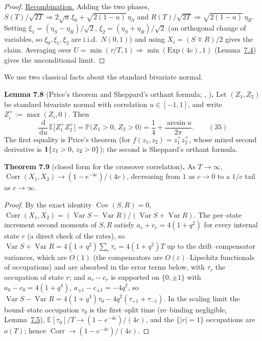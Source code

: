 \documentclass[11pt]{article}
\theoremstyle{plain}
\theoremstyle{definition}
\theoremstyle{remark}
\DeclareMathOperator{\Var}{Var}\DeclareMathOperator{\Cov}{Cov}
\DeclareMathOperator{\Corr}{Corr}\DeclareMathOperator{\cum}{cum}
\newcommand{\E}{\mathbb{E}}\newcommand{\PP}{\mathbb{P}}\newcommand{\dd}{\,\mathrm{d}}
\newcommand{\To}{\Rightarrow}\newcommand{\so}{\mathfrak{so}}
\newcommand{\eps}{\varepsilon}\newcommand{\Exp}{\mathrm{Exp}}
\begin{document}
\begin{proof}
\underline{Recombination.} Adding the two phases,
$S(T)/\sqrt{2T}\To2\sqrt u\,\xi_0+\sqrt{2(1-u)}\,\eta_S$ and
$R(T)/\sqrt{2T}\To\sqrt{2(1-u)}\,\eta_R$. Setting $\xi_1=(\eta_S-\eta_R)/\sqrt2$,
$\xi_2=(\eta_S+\eta_R)/\sqrt2$ (an orthogonal change of variables, so $\xi_0,\xi_1,\xi_2$
are i.i.d.\ $N(0,1)$) and using $X_i=(S\mp R)/2$ gives the claim. Averaging over
$U=\min(\tau/T,1)\To\min(\Exp(4c),1)$ (Lemma~\hyperref[lem_split]{7.4}) gives the unconditional limit.
\end{proof}

We use two classical facts about the standard bivariate normal.

\label{lem_price}\noindent\textbf{Lemma 7.8} (Price's theorem and Sheppard's orthant formula; {\cite{Price}}, {\cite{Sheppard}})\textbf{.} 
Let $(Z_1,Z_2)$ be standard bivariate normal with correlation $u\in[-1,1]$, and write
$Z_i^+:=\max(Z_i,0)$. Then
\label{eq_price}
\begin{equation}
  \frac{\dd}{\dd u}\,\E\big[Z_1^+Z_2^+\big]=\PP\big(Z_1>0,\,Z_2>0\big)
  =\frac14+\frac{\arcsin u}{2\pi}.\qquad(35)
\end{equation}
The first equality is Price's theorem (for $f(z_1,z_2)=z_1^+z_2^+$, whose mixed second
derivative is $\mathbf 1\{z_1>0,\,z_2>0\}$); the second is Sheppard's orthant formula.
\par

\label{thm_closed}\noindent\textbf{Theorem 7.9} (closed form for the crossover correlation)\textbf{.} 
As $T\to\infty$, $\Corr(X_1,X_2)\to(1-e^{-4c})/(4c)$, decreasing from $1$ as $c\to0$ to a
$1/c$ tail as $c\to\infty$.
\par
\begin{proof}
By the exact identity $\Cov(S,R)=0$,
$\Corr(X_1,X_2)=(\Var S-\Var R)/(\Var S+\Var R)$. The per--state increment second
moments of $S,R$ satisfy $a_r+c_r=4(1+q^2)$ for every internal state $r$ (a direct
check of the rates), so $\Var S+\Var R=4(1+q^2)\sum_r\tau_r=4(1+q^2)T$ up to the
drift--compensator variances, which are $O(1)$ (the compensators are
$O(\eps)$--Lipschitz functionals of occupations) and are absorbed in the error terms
below, with $\tau_r$ the occupation of state $r$; and $a_r-c_r$ is supported on $\{0,\pm1\}$ with
$a_0-c_0=4(1+q^4)$, $a_{\pm1}-c_{\pm1}=-4q^2$, so
$\Var S-\Var R=4(1+q^4)\tau_0-4q^2(\tau_{+1}+\tau_{-1})$. In the scaling limit the
bound--state occupation $\tau_0$ is the first--split time (re--binding negligible,
Lemma~\hyperref[lem_rebind]{7.5}), $\E[\tau_0]/T\to(1-e^{-4c})/(4c)$, and the $\{|r|=1\}$
occupations are $o(T)$; hence $\Corr\to(1-e^{-4c})/(4c)$.
\end{proof}
\end{document}
